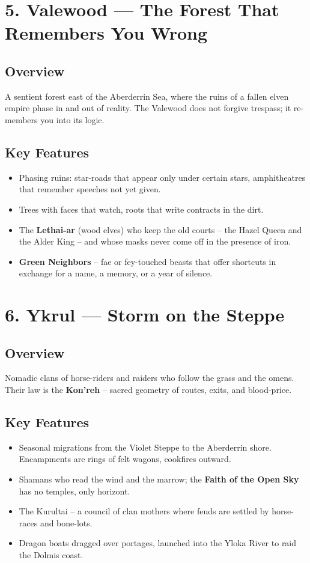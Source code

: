 \documentclass[11pt]{article}
\begin{document}
\section*{5. Valewood --- The Forest That Remembers You Wrong}

\subsection*{Overview}
A sentient forest east of the Aberderrin Sea, where the ruins of a fallen elven empire phase in and out of reality. The Valewood does not forgive trespass; it re-members you into its logic.

\subsection*{Key Features}
\begin{itemize}[leftmargin=*]
    \item Phasing ruins: star-roads that appear only under certain stars, amphitheatres that remember speeches not yet given.
    \item Trees with faces that watch, roots that write contracts in the dirt.
    \item The \textbf{Lethai-ar} (wood elves) who keep the old courts -- the Hazel Queen and the Alder King -- and whose masks never come off in the presence of iron.
    \item \textbf{Green Neighbors} -- fae or fey-touched beasts that offer shortcuts in exchange for a name, a memory, or a year of silence.
\end{itemize}

\section*{6. Ykrul --- Storm on the Steppe}

\subsection*{Overview}
Nomadic clans of horse-riders and raiders who follow the grass and the omens. Their law is the \textbf{Kon'reh} -- sacred geometry of routes, exits, and blood-price.

\subsection*{Key Features}
\begin{itemize}[leftmargin=*]
    \item Seasonal migrations from the Violet Steppe to the Aberderrin shore. Encampments are rings of felt wagons, cookfires outward.
    \item Shamans who read the wind and the marrow; the \textbf{Faith of the Open Sky} has no temples, only horizont.
    \item The Kurultai -- a council of clan mothers where feuds are settled by horse-races and bone-lots.
    \item Dragon boats dragged over portages, launched into the Yloka River to raid the Dolmis coast.
\end{itemize}
\end{document}

